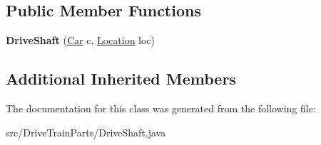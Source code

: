 \subsection*{Public Member Functions}
\begin{DoxyCompactItemize}
\item 
\hypertarget{classDriveTrainParts_1_1DriveShaft_ae3ec3833a77c41c630b3f178bea50879}{}{\bfseries Drive\+Shaft} (\hyperlink{classCars_1_1Car}{Car} c, \hyperlink{enumEnums_1_1Location}{Location} loc)\label{classDriveTrainParts_1_1DriveShaft_ae3ec3833a77c41c630b3f178bea50879}

\end{DoxyCompactItemize}
\subsection*{Additional Inherited Members}


The documentation for this class was generated from the following file\+:\begin{DoxyCompactItemize}
\item 
src/\+Drive\+Train\+Parts/Drive\+Shaft.\+java\end{DoxyCompactItemize}
